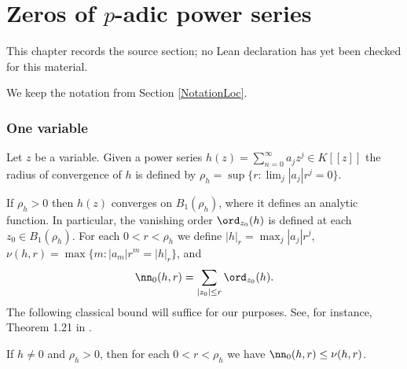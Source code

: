 \chapter{Zeros of $p$-adic power series}
\label{chabauty-coleman-bound-surfaces-chapter-06}

\begin{remark}
\label{chabauty-coleman-bound-surfaces-chapter-06-source}
This chapter records the source section; no Lean declaration has yet been checked for this material.
\notready
\end{remark}

\label{SecZeros}

We keep the notation from Section \ref{NotationLoc}.

\subsection{One variable} Let $z$ be a variable. Given a power series $h(z)=\sum_{n=0}^\infty a_j z^j\in K[[z]]$ the radius of convergence of $h$ is defined by $\rho_h=\sup\{ r : \lim_j |a_j|r^j=0 \}$.

If $\rho_h>0$ then $h(z)$ converges on $B_1(\rho_h)$, where it defines an analytic function. In particular, the vanishing order $\ord_{z_0}(h)$ is defined at each $z_0\in B_1(\rho_h)$. For each $0<r<\rho_h$ we define $|h|_r=\max_j |a_j|r^j$, $\nu(h,r)=\max\{m : |a_m|r^m=|h|_r\}$, and
$$
\nn_0(h,r)=\sum_{|z_0|\le r} \ord_{z_0}(h).
$$
The following classical bound will suffice for our purposes. See, for instance,  Theorem 1.21 in \cite{HuYang}.
\begin{lemma}
\notready\label{LemmaZeros1var} If $h\ne 0$ and $\rho_h>0$, then for each $0<r<\rho_h$ we have $\nn_0(h,r)\le \nu(h,r)$.
\end{lemma}

